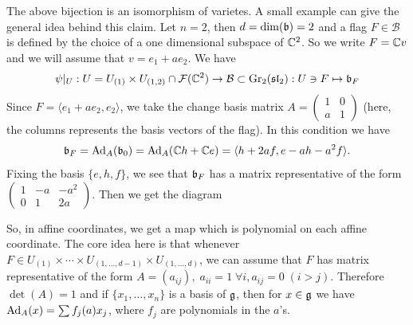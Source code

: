 The above bijection is an isomorphism of varietes. A small example can give the general idea behind this claim. Let 
$n=2$, then $d=\dim(\mathfrak{b})=2$ and a flag $F\in\mathcal{B}$ is defined by the choice of a one dimensional subspace of 
$\mathbb{C}^2$. So we write $F=\mathbb{C} v$ and we will assume that $v=e_1 + ae_2$. We have 
\begin{equation}
    \psi|_U: U=U_{(1)}\times U_{(1,2)}\cap\mathcal{F}(\mathbb{C}^2)\rightarrow\mathcal{B}\subset \text{Gr}_2(\mathfrak{sl}_2):
    U\ni F\mapsto \mathfrak{b}_F
\end{equation}
Since $F=\langle e_1+ae_2, e_2\rangle$, we take the change basis matrix $A=\left(\begin{smallmatrix}1&0\\a&1\end{smallmatrix}\right)$
(here, the columns represents the basis vectors of the flag). In this condition we have 
\begin{equation}
    \mathfrak{b}_F=\text{Ad}_A(\mathfrak{b}_0)=\text{Ad}_A(\mathbb{C} h+\mathbb{C} e)=\langle h + 2af, e -ah-a^2f\rangle.
\end{equation}
Fixing the basis $\{e,h,f\}$, we see that $\mathfrak{b}_F$ has a matrix representative of the form 
$\left(\begin{smallmatrix}1&-a&-a^2\\0&1&2a\end{smallmatrix}\right)$. Then we get the diagram 
\begin{center}
\end{center}
So, in affine coordinates, we get a map which is polynomial on each affine coordinate. 
The core idea here is that whenever $F\in U_{(1)}\times\cdots\times U_{(1,\dots,d-1)}\times U_{(1,\dots,d)}$, we can assume 
that $F$ has matrix representative of the form $A=(a_{ij}),\;a_{ii}=1\;\forall i,a_{ij}=0\;(i>j)$. Therefore $\det(A)=1$ and if 
$\{x_1,\dots,x_n\}$ is a basis of $\mathfrak{g}$, then for $x\in\mathfrak{g}$ we have 
$\text{Ad}_A(x)=\sum f_j(a)x_j$, where $f_j$ are polynomials in the $a$'s. 


